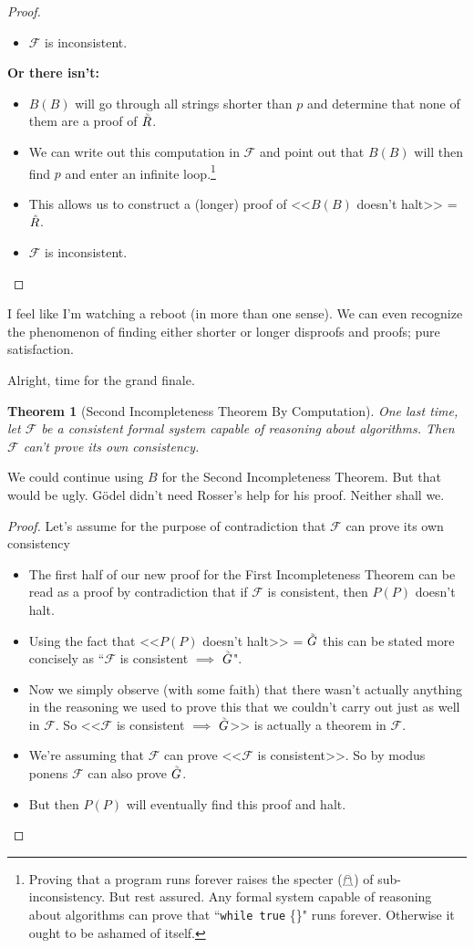 \documentclass{article}
\theoremstyle{theorem}
\newtheorem{theorem}{Theorem}
\newcommand{\nameditem}[1]{\item\textbf{#1}}
\newcommand{\impl}{\item[$\Rightarrow$]}
\newcommand{\infi}[1]{\accentset{\scalebox{0.35}{$\infty$}}{#1}}
\begin{document}
\begin{proof}
\begin{description}
\begin{description}
\begin{itemize}
\impl $\mathcal{F}$ is inconsistent. \lightning
\end{itemize}
\nameditem{Or there isn't:}
\begin{itemize}
\impl $B(B)$ will go through all strings shorter than $p$ and determine that none of them are a proof of $\infi{R}$.
\impl We can write out this computation in $\mathcal{F}$ and point out that $B(B)$ will then find $p$ and enter an infinite loop.\footnote{Proving that a program runs forever raises the specter ($\mathghost$) of sub-inconsistency. But rest assured. Any formal system capable of reasoning about algorithms can prove that ``\lstinline{while true} \{\}" runs forever. Otherwise it ought to be ashamed of itself.}
\impl This allows us to construct a (longer) proof of <<$B(B)$ doesn't halt>> = $\infi{R}$.
\impl $\mathcal{F}$ is inconsistent. \lightning
\end{itemize}
\end{description}
\end{description}
\end{proof}

I feel like I'm watching a reboot (in more than one sense). We can even recognize the phenomenon of finding either shorter or longer disproofs and proofs; pure satisfaction.

Alright, time for the grand finale.

\begin{theorem}[Second Incompleteness Theorem By Computation]
One last time, let $\mathcal{F}$ be a consistent formal system capable of reasoning about algorithms. Then $\mathcal{F}$ can't prove its own consistency.
\end{theorem}

We could continue using $B$ for the Second Incompleteness Theorem. But that would be ugly. Gödel didn't need Rosser's help for his proof. Neither shall we.

\begin{proof}
Let's assume for the purpose of contradiction that $\mathcal{F}$ can prove its own consistency
\begin{itemize}
\impl The first half of our new proof for the First Incompleteness Theorem can be read as a proof by contradiction that if $\mathcal{F}$ is consistent, then $P(P)$ doesn't halt.
\impl Using the fact that <<$P(P)$ doesn't halt>> = $\infi{G}$ this can be stated more concisely as ``$\mathcal{F}$ is consistent $\implies$ $\infi{G}$".
\impl Now we simply observe (with some faith) that there wasn't actually anything in the reasoning we used to prove this that we couldn't carry out just as well in $\mathcal{F}$. So <<$\mathcal{F}$ is consistent $\implies$ $\infi{G}$>> is actually a theorem in $\mathcal{F}$.
\impl We're assuming that $\mathcal{F}$ can prove <<$\mathcal{F}$ is consistent>>. So by modus ponens $\mathcal{F}$ can also prove $\infi{G}$.
\impl But then $P(P)$ will eventually find this proof and halt. \lightning
\end{itemize}
\end{proof}
\end{document}
